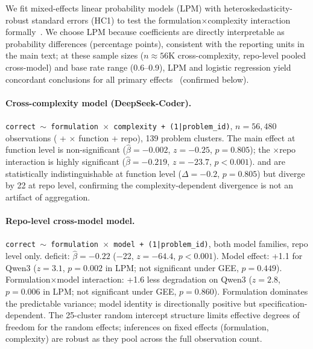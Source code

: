 We fit mixed-effects linear probability models (LPM) with heteroskedasticity-robust standard errors (HC1) to test the formulation$\times$complexity interaction formally~\cite{moulton1990}. We choose LPM because coefficients are directly interpretable as probability differences (percentage points), consistent with the reporting units in the main text; at these sample sizes ($n{\approx}56$K cross-complexity, repo-level pooled cross-model) and base rate range (0.6--0.9), LPM and logistic regression yield concordant conclusions for all primary effects~\cite{angrist2009mostly} (confirmed below).

\paragraph{Cross-complexity model (DeepSeek-Coder).} \texttt{correct $\sim$ formulation $\times$ complexity + (1|problem\_id)}, $n{=}56{,}480$ observations (\cls{} + \cwm{} $\times$ function + repo), 139 problem clusters. The \cwm{} main effect at function level is non-significant ($\hat{\beta}{=}-0.002$, $z{=}-0.25$, $p{=}0.805$); the \cwm{}$\times$repo interaction is highly significant ($\hat{\beta}{=}-0.219$, $z{=}-23.7$, $p{<}0.001$). \cwm{} and \cls{} are statistically indistinguishable at function level ($\Delta{=}-0.2$\pp{}, $p{=}0.805$) but diverge by 22\pp{} at repo level, confirming the complexity-dependent divergence is not an artifact of aggregation.

\paragraph{Repo-level cross-model model.} \texttt{correct $\sim$ formulation $\times$ model + (1|problem\_id)}, both model families, repo level only. \cwm{} deficit: $\hat{\beta}{=}-0.22$ ($-$22\pp{}, $z{=}-64.4$, $p{<}0.001$). Model effect: +1.1\pp{} for Qwen3 ($z{=}3.1$, $p{=}0.002$ in LPM; not significant under GEE, $p{=}0.449$). Formulation$\times$model interaction: +1.6\pp{} less \cwm{} degradation on Qwen3 ($z{=}2.8$, $p{=}0.006$ in LPM; not significant under GEE, $p{=}0.860$). Formulation dominates the predictable variance; model identity is directionally positive but specification-dependent. The 25-cluster random intercept structure limits effective degrees of freedom for the random effects; inferences on fixed effects (formulation, complexity) are robust as they pool across the full observation count.

